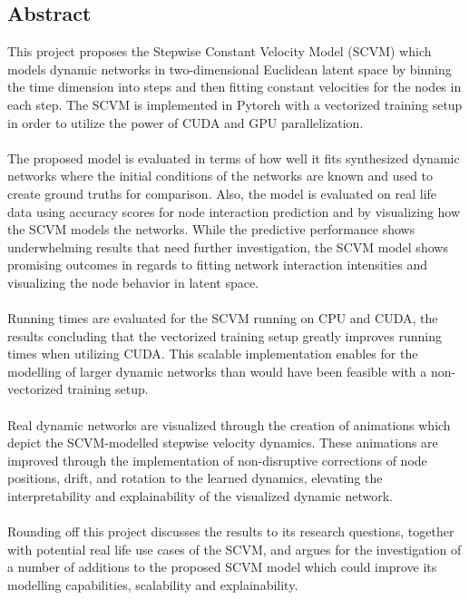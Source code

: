 \subsection*{Abstract}

This project proposes the Stepwise Constant Velocity Model (SCVM) which models dynamic networks in two-dimensional Euclidean latent space by binning the time dimension into steps and then fitting constant velocities for the nodes in each step.
The SCVM is implemented in Pytorch with a vectorized training setup in order to utilize the power of CUDA and GPU parallelization.
\\\\
The proposed model is evaluated in terms of how well it fits synthesized dynamic networks where the initial conditions of the networks are known and used to create ground truths for comparison. Also, the model is evaluated on real life data using accuracy scores for node interaction prediction and by visualizing how the SCVM models the networks. While the predictive performance shows underwhelming results that need further investigation, the SCVM model shows promising outcomes in regards to fitting network interaction intensities and visualizing the node behavior in latent space.
\\\\
Running times are evaluated for the SCVM running on CPU and CUDA, the results concluding that the vectorized training setup greatly improves running times when utilizing CUDA.
This scalable implementation enables for the modelling of larger dynamic networks than would have been feasible with a non-vectorized training setup.
\\\\
Real dynamic networks are visualized through the creation of animations which depict the SCVM-modelled stepwise velocity dynamics.
These animations are improved through the implementation of non-disruptive corrections of node positions, drift, and rotation to the learned dynamics, elevating the interpretability and explainability of the visualized dynamic network.
\\\\
Rounding off this project discusses the results to its research questions, together with potential real life use cases of the SCVM, and argues for the investigation of a number of additions to the proposed SCVM model which could improve its modelling capabilities, scalability and explainability.
